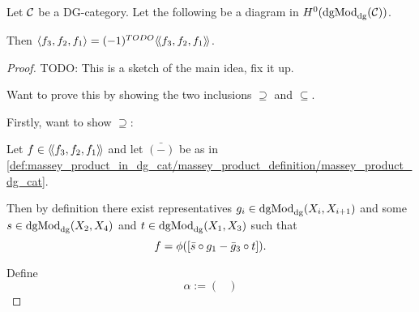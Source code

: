 \begin{question}

\end{question}

\begin{theorem}
    Let \( {\mathcal{C}} \) be a DG-category. Let the following be a diagram in \( H^0(\operatorname{dgMod}_{\operatorname{dg}}({\mathcal{C}})) \).
    \begin{center}
    \end{center}
    Then \( \langle f_3, f_2, f_1\rangle = (-1)^{TODO} \langle \! \langle f_3, f_2, f_1\rangle \! \rangle \).
\end{theorem}
\begin{proof}
    TODO: This is a sketch of the main idea, fix it up.

    Want to prove this by showing the two inclusions \( \supseteq \) and \( \subseteq \).

    Firstly, want to show \( \supseteq \):

    Let \( f \in \langle \! \langle f_3, f_2, f_1\rangle \! \rangle \) and let \( \bar{(-)} \) be as in \autoref{def:massey_product_in_dg_cat/massey_product_definition/massey_product_dg_cat}.
    
    Then by definition there exist representatives \( g_i \in \operatorname{dgMod}_{\operatorname{dg}}(X_i, X_{i + 1}) \) and some \( s \in \operatorname{dgMod}_{\operatorname{dg}}(X_2, X_4) \) and \( t \in \operatorname{dgMod}_{\operatorname{dg}}(X_1, X_3) \) such that
    \[
        f = \phi([\bar{s} \circ g_1 - \bar{g}_3 \circ t]).
    \]

    Define
    \[
        \alpha := 
        \begin{pmatrix}
            
        \end{pmatrix}
    \]

\end{proof}

